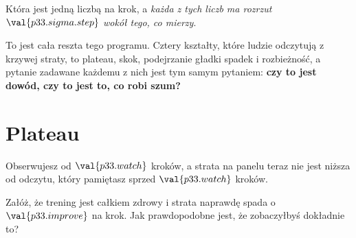 \begin{fr}
Która jest jedną liczbą na krok, a \emph{każda z tych liczb ma rozrzut
$\val{p33.sigma.step}$ wokół tego, co mierzy}.

To jest cała reszta tego programu. Cztery kształty, które ludzie odczytują z
krzywej straty, to plateau, skok, podejrzanie gładki spadek i rozbieżność, a
pytanie zadawane każdemu z nich jest tym samym pytaniem:
\textbf{czy to jest dowód, czy to jest to, co robi szum?}
\end{fr}

\section{Plateau}
\label{sec:P33-plateau}


\begin{fr}
Obserwujesz od $\val{p33.watch}$ kroków, a strata na panelu teraz nie jest
niższa od odczytu, który pamiętasz sprzed $\val{p33.watch}$ kroków.

Załóż, że trening jest całkiem zdrowy i strata naprawdę spada o
$\val{p33.improve}$ na krok. Jak prawdopodobne jest, że zobaczyłbyś dokładnie
to?
\dotline
\nextframe
\end{fr}

